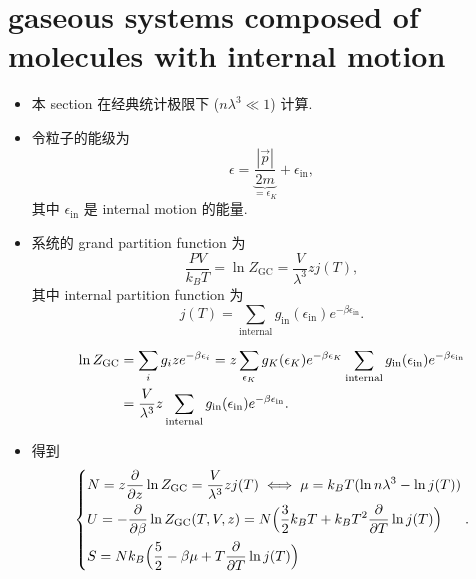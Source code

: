\section{gaseous systems composed of molecules with internal motion}
\begin{itemize}
	\item 本 section 在经典统计极限下 ($n \lambda^3 \ll 1$) 计算.
	
	\item 令粒子的能级为
	\begin{equation}
		\epsilon = \underbrace{\frac{|\vec{p}|}{2 m}}_{= \epsilon_K} + \epsilon_\text{in},
	\end{equation}
	其中 $\epsilon_\text{in}$ 是 internal motion 的能量.
	
	\item 系统的 grand partition function 为
	\begin{equation}
		\frac{P V}{k_B T} = \ln Z_\text{GC} = \frac{V}{\lambda^3} z j(T),
	\end{equation}
	其中 internal partition function 为
	\begin{equation}
		j(T) = \sum_\text{internal} g_\text{in}(\epsilon_\text{in}) e^{- \beta \epsilon_\text{in}}.
	\end{equation}
	
	\begin{tcolorbox}[title=calculation:]
		\begin{align}
			\ln Z_\text{GC} &= \sum_i g_i z e^{- \beta \epsilon_i} = z \sum_{\epsilon_K} g_K(\epsilon_K) e^{- \beta \epsilon_K} \sum_\text{internal} g_\text{in}(\epsilon_\text{in}) e^{- \beta \epsilon_\text{in}} \notag \\
			&= \frac{V}{\lambda^3} z \sum_\text{internal} g_\text{in}(\epsilon_\text{in}) e^{- \beta \epsilon_\text{in}}.
		\end{align}
	\end{tcolorbox}
	
	\item 得到
	\begin{equation}
		\begin{dcases}
			N = z \frac{\partial}{\partial z} \ln Z_\text{GC} = \frac{V}{\lambda^3} z j(T) \iff \mu = k_B T (\ln n \lambda^3 - \ln j(T)) \\
			U = - \frac{\partial}{\partial \beta} \ln Z_\text{GC}(T, V, z) = N \Big( \frac{3}{2} k_B T + k_B T^2 \frac{\partial}{\partial T} \ln j(T) \Big) \\
			S = N k_B \Big( \frac{5}{2} - \beta \mu + T \frac{\partial}{\partial T} \ln j(T) \Big)
		\end{dcases}.
	\end{equation}
	

\end{itemize}
